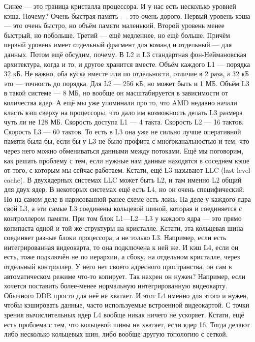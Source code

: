 \documentclass{article}
\begin{document}
    Синее --- это граница кристалла процессора. И у нас есть несколько уровней кэша. Почему? Очень быстрая память --- это очень дорого. Первый уровень кэша --- это очень быстро, но объём памяти маленький. Второй уровень менее быстрый, но побольше. Третий --- ещё медленнее, но ещё больше. Причём первый уровень имеет отдельный фрагмент для команд и отдельный --- для данных. Потом ещё обсудим, почему. В L2 и L3 стандартная фон-Неймановская архитектура, когда и то, и другое хранится вместе. Объём каждого L1 --- порядка 32 кБ. Не важно, оба куска вместе или по отдельности, отличие в 2 раза, а 32 кБ это --- точность до порядка. Для L2 --- 256 кБ, но может быть и 1 МБ. Объём L3 в такой системе --- 8 МБ, но вообще он масштабируется в зависимости от количества ядер. А ещё мы уже упоминали про то, что AMD недавно начали класть кэш сверху на процессоры, что дало им возможность делать L3 размера чуть ли не 128 МБ. Скорость доступа L1 --- 4 такта. Скорость L2 --- 16 тактов. Скорость L3 --- 60 тактов. То есть в L3 она уже не сильно лучше оперативной памяти была бы, если бы у L3 не было профита с многоканальностью и тем, что через него можно обмениваться данными между потоками. Ещё мы поговорим, как решать проблему с тем, если нужные нам данные находятся в соседнем кэше от того, с которым мы сейчас работаем. Кстати, ещё L3 называют LLC (last level cache). В двухядерных системах LLC может быть L2, и там именно L2 общий для двух ядер. В некоторых системах ещё есть L4, но он очень специфический. Но на самом деле в нарисованной ранее схеме есть ложь. На деле у каждого ядра свой L3, а эти самые L3 соединены кольцевой шиной, которая и соединяется с контроллером памяти. При том блок L1---L2---L3 у каждого ядра --- это прямо копипаста одной и той же структуры на кристалле. Кстати, эта кольцевая шина соединяет разные блоки процессора, а не только L3. Например, если есть интегрированная видеокарта, то она подключена к ней же. И кэш L4, если он есть, тоже подключён не по иерархии, а сбоку, на отдельном кристалле, через отдельный контроллер. У него нет своего адресного пространства, он сам в автоматическом режиме что-то копирует. Так нахрен он нужен? Например, если хочется поставить более-менее нормальную интегрированную видеокарту. Обычного DDR просто для неё не хватает. И этот L4 именно для этого и нужен, чтобы кэшировать данные, часто используемые встроенной видеокартой. С точки зрения вычислительных ядер L4 вообще никак ничего не ускоряет. Кстати, ещё есть проблема с тем, что кольцевой шины не хватает, если ядер 16. Тогда делают либо несколько кольцевых шин, либо вообще другую топологию с сеткой.\\
\end{document}

